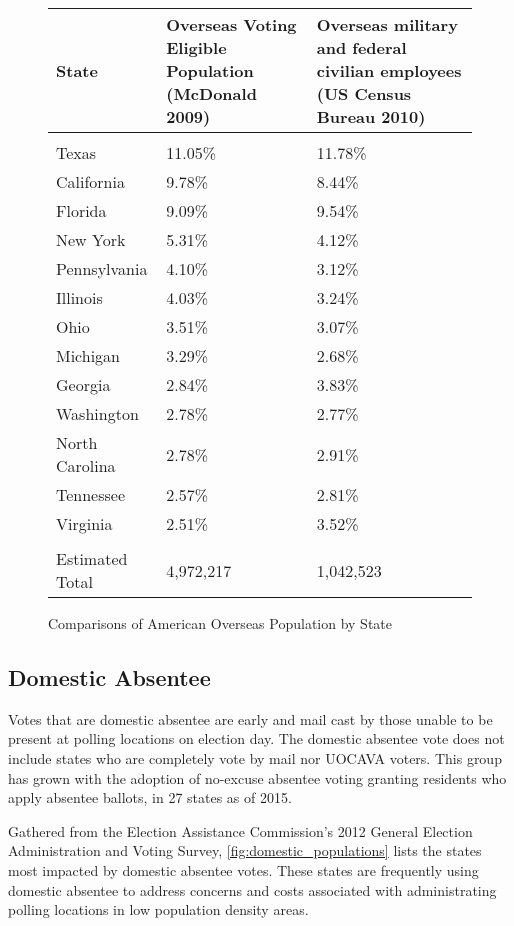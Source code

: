 \begin{figure}
\begin{center}
\begin{tabular}{l p{} p{}} %
{\bf State} & {\bf Overseas Voting Eligible \newline Population} \newline(McDonald 2009) & {\bf Overseas military and federal \newline civilian employees} \newline(US Census Bureau 2010)\\\hline\\
Texas & 11.05\% & 11.78\%\\
California & 9.78\% & 8.44\% \\
Florida & 9.09\% & 9.54\% \\
New York & 5.31\% & 4.12\% \\
Pennsylvania & 4.10\% & 3.12\% \\
Illinois & 4.03\% & 3.24\% \\
Ohio & 3.51\% & 3.07\% \\
Michigan & 3.29\% & 2.68\% \\
Georgia & 2.84\% & 3.83\% \\
Washington & 2.78\% & 2.77\% \\
North Carolina & 2.78\% & 2.91\% \\
Tennessee & 2.57\% & 2.81\% \\
Virginia & 2.51\% & 3.52\% \\\hline\\
Estimated Total & 4,972,217 & 1,042,523
\end{tabular}
\end{center}
\caption{Comparisons of American Overseas Population by State}
\label{fig:uocava_populations}
\end{figure}

\subsection{Domestic Absentee}
Votes that are domestic absentee are early and mail cast by those unable to be present at polling locations on election day. The domestic absentee vote does not include states who are completely vote by mail nor UOCAVA voters. This group has grown with the adoption of no-excuse absentee voting granting residents who apply absentee ballots, in 27 states as of 2015.

Gathered from the Election Assistance Commission's 2012 General Election Administration and Voting Survey, \autoref{fig:domestic_populations} lists the states most impacted by domestic absentee votes. These states are frequently using domestic absentee to address concerns and costs associated with administrating polling locations in low population density areas.

